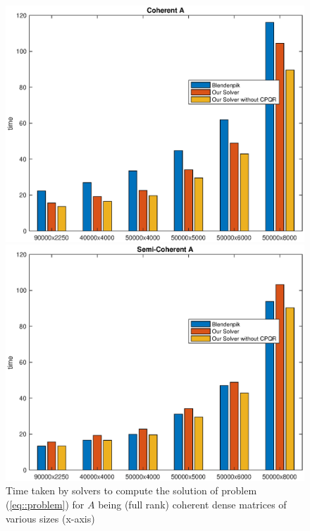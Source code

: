 \documentclass[english,11pt]{article}
\begin{document}
\newcommand{\mysize}{0.45}
\begin{figure}[H]
    \centering
    \begin{minipage}{\mysize\textwidth}
        \centering
        \includegraphics[width=\textwidth]{images/dense_co.eps} %
        \caption{Time taken by solvers to compute the solution of problem (\ref{eq::problem}) for $A$ being (full rank) coherent dense matrices of various sizes (x-axis)}
        \label{fig::compare_blen_coherent}
    \end{minipage}\hfill
    \begin{minipage}{\mysize\textwidth}
        \centering
        \includegraphics[width=\textwidth]{images/dense_semico.eps} %

\end{minipage}
\end{figure}
\end{document}
